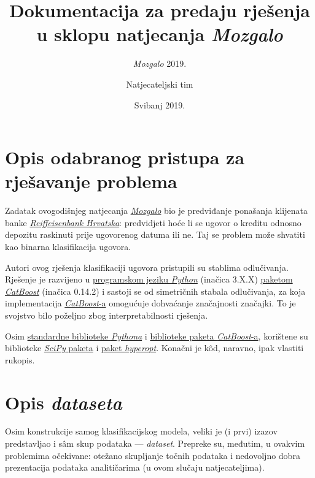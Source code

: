 \documentclass[paper = a4, fontsize = 11pt, DIV = 12, BCOR = 0pt, headings = standardclasses, numbers = endperiod]{scrartcl}
\title{Dokumentacija za predaju rješenja u sklopu natjecanja \emph{Mozgalo}}
\subtitle{\emph{Mozgalo} 2019.}
\author{Natjecateljski tim}
\date{Svibanj 2019.}
\begin{document}
	\maketitle

	\section{Opis odabranog pristupa za rješavanje problema}
	\label{sec:opis_pristupa}

	Zadatak ovogodišnjeg natjecanja \href{http://estudent.hr/category/natjecanja/mozgalo/}{\emph{Mozgalo}} bio je predviđanje ponašanja klijenata banke \href{http://rba.hr/}{\emph{Reiffeisenbank Hrvatska}}: predvidjeti hoće li se ugovor o kreditu odnosno depozitu raskinuti prije ugovorenog datuma ili ne. Taj se problem može shvatiti kao binarna klasifikacija ugovora.

	\par

	Autori ovog rješenja klasifikaciji ugovora pristupili su stablima odlučivanja. Rješenje je razvijeno u \href{http://python.org}{programskom jeziku \emph{Python}} (inačica 3.X.X) \href{http://catboost.ai}{paketom \emph{CatBoost}} (inačica 0.14.2) i sastoji se od simetričnih stabala odlučivanja, za koja implementacija \href{http://catboost.ai}{\emph{CatBoost}-a} omogućuje dohvaćanje značajnosti značajki. To je svojstvo bilo poželjno zbog interpretabilnosti rješenja.

	\par

	Osim \href{http://docs.python.org/3/library/}{standardne biblioteke \emph{Pythona}} i \href{http://catboost.ai/docs}{biblioteke paketa \emph{CatBoost}-a}, korištene su biblioteke \href{http://scipy.org/docs.html}{\emph{SciPy} paketa} i \href{http://hyperopt.github.io/hyperopt/}{paket \emph{hyperopt}}. Konačni je k\^{o}d, naravno, ipak vlastiti rukopis.

	\par

	\section{Opis \emph{dataseta}}
	\label{sec:opis_dataseta}

	Osim konstrukcije samog klasifikacijskog modela, veliki je (i prvi) izazov predstavljao i s\^{a}m skup podataka --- \emph{dataset}. Prepreke su, međutim, u ovakvim problemima očekivane: otežano skupljanje točnih podataka i nedovoljno dobra prezentacija podataka analitičarima (u ovom slučaju natjecateljima).
\end{document}
